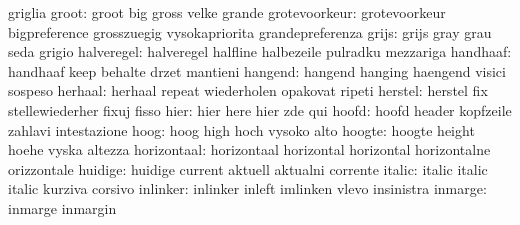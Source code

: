                            griglia
                    groot: groot                     big
                           gross                     velke
                           grande
            grotevoorkeur: grotevoorkeur             bigpreference
                           grosszuegig               vysokapriorita
                           grandepreferenza
                    grijs: grijs                     gray
                           grau                      seda
                           grigio
               halveregel: halveregel                halfline
                           halbezeile                pulradku
                           mezzariga
                 handhaaf: handhaaf                  keep
                           behalte                   drzet
                           mantieni
                  hangend: hangend                   hanging
                           haengend                  visici
                           sospeso
                  herhaal: herhaal                   repeat
                           wiederholen               opakovat
                           ripeti
                  herstel: herstel                   fix
                           stellewiederher           fixuj
                           fisso
                     hier: hier                      here
                           hier                      zde
                           qui
                    hoofd: hoofd                     header
                           kopfzeile                 zahlavi
                           intestazione %
                     hoog: hoog                      high
                           hoch                      vysoko
                           alto
                   hoogte: hoogte                    height
                           hoehe                     vyska
                           altezza
              horizontaal: horizontaal               horizontal
                           horizontal                horizontalne
                           orizzontale
                  huidige: huidige                   current
                           aktuell                   aktualni
                           corrente
                   italic: italic                    italic
                           italic                    kurziva
                           corsivo
                 inlinker: inlinker                  inleft
                           imlinken                  vlevo
                           insinistra
                  inmarge: inmarge                   inmargin

